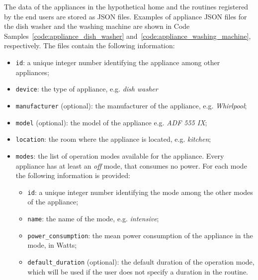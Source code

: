 The data of the appliances in the hypothetical home and the routines registered by the end users are stored as JSON files.
Examples of appliance JSON files for the dish washer and the washing machine are shown in Code Samples~\ref{code:appliance_dish_washer} and~\ref{code:appliance_washing_machine}, respectively. The files contain the following information:
\begin{itemize}
    \item \texttt{id}: a unique integer number identifying the appliance among other appliances;
    \item \texttt{device}: the type of appliance, e.g. \textit{dish washer}
    \item \texttt{manufacturer} (optional): the manufacturer of the appliance, e.g. \textit{Whirlpool};
    \item \texttt{model} (optional): the model of the appliance e.g. \textit{ADF 555 IX};
    \item \texttt{location}: the room where the appliance is located, e.g. \textit{kitchen};
    \item \texttt{modes}: the list of operation modes available for the appliance. Every appliance has at least an \textit{off} mode, that consumes no power. For each mode the following information is provided:
          \begin{itemize}
              \item \texttt{id}: a unique integer number identifying the mode among the other modes of the appliance;
              \item \texttt{name}: the name of the mode, e.g. \textit{intensive};
              \item \texttt{power\_consumption}: the mean power consumption of the appliance in the mode, in Watts;
              \item \texttt{default\_duration} (optional): the default duration of the operation mode, which will be used if the user does not specify a duration in the routine.
          \end{itemize}
\end{itemize}





